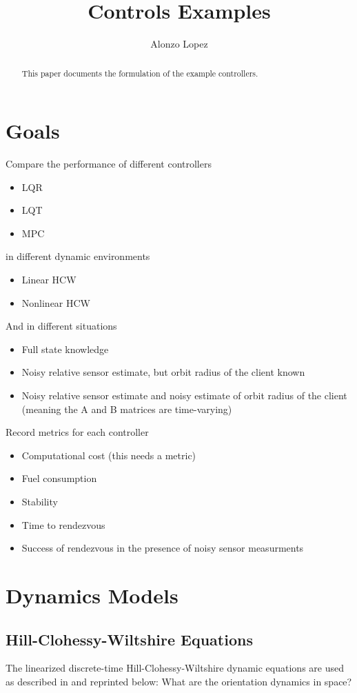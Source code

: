 \documentclass{article}
\title{Controls Examples}
\author{Alonzo Lopez}
\begin{document}
\maketitle

\begin{abstract}
    This paper documents the formulation of the example controllers.
\end{abstract}

\section{Goals}

Compare the performance of different controllers
\begin{itemize}
    \item LQR
    \item LQT
    \item MPC
\end{itemize}
in different dynamic environments
\begin{itemize}
    \item Linear HCW
    \item Nonlinear HCW
\end{itemize}
And in different situations
\begin{itemize}
    \item Full state knowledge
    \item Noisy relative sensor estimate, but orbit radius of the client known
    \item Noisy relative sensor estimate and noisy estimate of orbit radius of the client (meaning the A and B matrices are time-varying)
\end{itemize}
Record metrics for each controller
\begin{itemize}
    \item Computational cost (this needs a metric)
    \item Fuel consumption
    \item Stability
    \item Time to rendezvous
    \item Success of rendezvous in the presence of noisy sensor measurments
\end{itemize}

\section{Dynamics Models}
\subsection{Hill-Clohessy-Wiltshire Equations}
The linearized discrete-time Hill-Clohessy-Wiltshire dynamic equations are used as described in \cite{2017_Jewison} and reprinted below:
What are the orientation dynamics in space?
\end{document}
